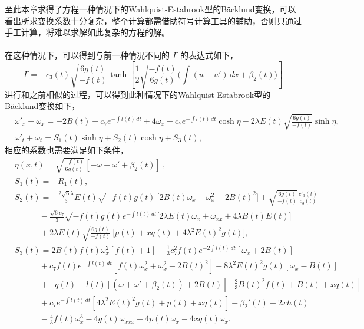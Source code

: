 至此本章求得了方程一种情况下的Wahlquist-Estabrook型的B\"{a}cklund变换，可以看出所求变换系数十分复杂，整个计算都需借助符号计算工具的辅助，否则只通过手工计算，将难以求解如此复杂的方程的解。\\
\vspace{1mm}
\vspace{1mm}\\
在这种情况下，可以得到与前一种情况不同的 $\Gamma$ 的表达式如下，
\begin{equation}
\Gamma=-c_3(t) \sqrt{\frac{6g(t)}{-f(t)}} \tanh \left[\frac{1}{2} \sqrt{\frac{-f(t)}{6 g(t)}} \Big(\int (u-u') \, dx+\beta_2(t)\Big)\right] \label{mkdv-lp8-2}
\end{equation}
进行和之前相似的过程，可以得到此种情况下的Wahlquist-Estabrook型的B\"{a}cklund变换如下，
\begin{align}
& \omega'_x+\omega_x=-2 B(t)-c_7 e^{-\int l(t)\, dt}+ 4 \omega_x +c_7 e^{-\int l(t) \, dt} \cosh \eta
-2 \lambda  E(t) \sqrt{\frac{6g(t)}{-f(t)}} \sinh \eta , \label{lp8-3}  \\
& \omega'_t+\omega_t= S_1(t) \sinh \eta + S_2(t) \cosh \eta +S_3(t)  , \label{mkdv-lp9-1}
\end{align}
相应的系数也需要满足如下条件，
\begin{align}
&\eta(x,t)=\sqrt{\frac{-f(t)}{6g(t)}} [-\omega+\omega'+\beta_2(t)]\ ,\nonumber \\
\nonumber
& S_1(t)= -R_1(t),
\\ \nonumber
& S_2(t)= -\frac{2 \sqrt{6}  \lambda } {3} E(t) \sqrt{-f(t) g(t)}\, \big[ 2B(t)  \omega_x - \omega_x^2+2 B(t)^2 \big]+\sqrt{\frac{6g(t)}{-f(t)}}\frac{c'_3(t)}{c_3(t)}\\ \nonumber
& \quad\quad\quad
-\frac{\sqrt{6}c_7}{3}\sqrt{-f(t) g(t)} e^{-\int l(t) \, dt}
\big[2 \lambda  E(t) \omega_x +\omega_{xx}+4\lambda  B(t) E(t) \big]
\\ \nonumber
& \quad\quad\quad
 +2 \lambda E(t) \sqrt{\frac{6g(t)}{-f(t)}}\,\big[ p(t)   +  x  q(t)  + 4  \lambda ^2 E(t)^2 g(t) \big],\\
\nonumber
& S_3(t)= 2 B(t) f(t) \omega_x^2[f(t)+1] -\frac{1}{3} c_7^2 f(t)  e^{-2 \int l(t) \, dt}[\omega_x+2B(t)]\\ \nonumber
& \quad\quad\quad +c_7 f(t) e^{-\int l(t) \, dt}[f(t)  \omega_x^2+\omega_x^2-2B(t)^2]-8 \lambda ^2 E(t)^2 g(t) [\omega_x- B(t)] \\ \nonumber
& \quad\quad\quad
+[q(t)-l(t)](\omega+\omega'+\beta_2(t))
 +2B(t)[-\frac{2}{3} B(t)^2 f(t)+ B(t) + x  q(t)]
\\ \nonumber
& \quad\quad\quad + c_7 e^{-\int l(t) \, dt}[4\lambda ^2 E(t)^2 g(t) + p(t) + x q(t)]-\beta_2'(t)-2 x h(t)
\\ \nonumber
& \quad\quad\quad
-\frac{4}{3} f(t) \omega_x^3-4 g(t) \omega_{xxx}-4 p(t) \omega_x-4 x q(t) \omega_x.
\end{align}

